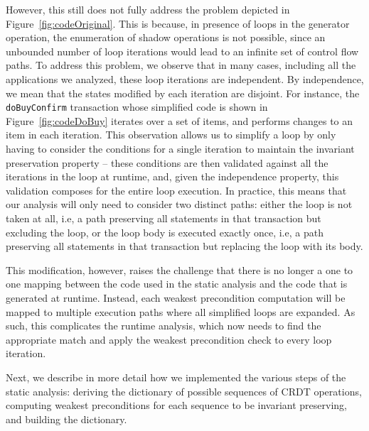 However, this still does not fully address the problem depicted
in Figure~\ref{fig:codeOriginal}. This is because,
in presence of loops in the generator operation, the
enumeration of shadow operations is not possible, since an unbounded
number of loop iterations would lead to an infinite set of control
flow paths.
To address this problem, we observe that in many cases, including
all the applications we analyzed, these loop iterations are independent.
By independence, we mean that the states modified by each iteration
are disjoint. For instance, the \texttt{doBuyConfirm} transaction whose
simplified code is shown in Figure~\ref{fig:codeDoBuy}
iterates over a set of items, and performs changes to an item in each iteration.
This observation allows us to simplify a loop by only having to consider the conditions
for a single iteration to maintain the invariant preservation property -- these
conditions are then validated against all the iterations in the loop at runtime, and,
given the independence property,
this validation composes for the entire loop execution.
In practice, this means that our analysis will only need to consider 
two distinct paths: 
either the loop is not taken at all, i.e, a path preserving
all statements in that transaction but excluding the loop, 
or the loop body is executed exactly once, 
i.e, a path preserving all statements in that transaction but 
replacing the loop with its body.

This modification, however, raises the challenge that there is no
longer a one to one mapping between the code used in the static analysis
and the code that is generated at runtime.  Instead, each weakest precondition
computation will be mapped to multiple
execution paths where all simplified loops are expanded. As such, this
complicates the runtime analysis, which now needs to find the appropriate
match and apply the weakest precondition check to every loop iteration.

Next, we describe in more detail how we implemented the various steps of the
static analysis: deriving the dictionary of possible sequences of CRDT
operations, computing weakest preconditions for each sequence to be
invariant preserving, and building the dictionary.

 
